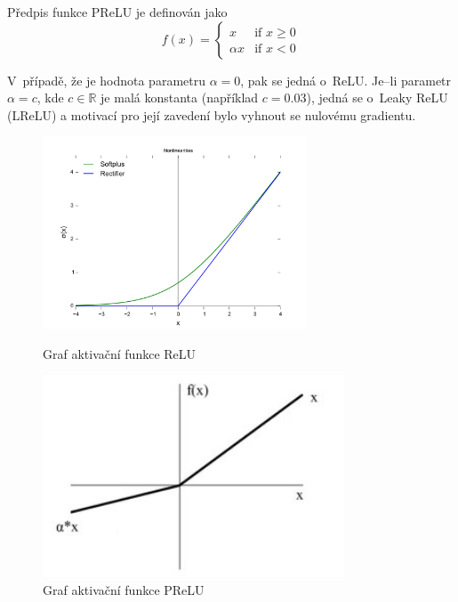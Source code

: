 Předpis funkce PReLU je definován jako
\begin{equation}
  f(x) =
  \begin{cases}
    x & \text{if } x \geq 0 \\
    {\alpha}x & \text{if } x < 0
  \end{cases}
\end{equation}


V~případě, že je hodnota parametru $\alpha=0$, pak se jedná o~ReLU. Je--li parametr $\alpha = c$, kde $c\in\mathbb{R}$ je malá konstanta (například $c = 0.03$), jedná se o~Leaky ReLU (LReLU) a motivací pro její zavedení bylo vyhnout se nulovému gradientu.


\begin{figure}[H]
    \centering
    \begin{minipage}{0.45\textwidth}
        \centering
        \includegraphics[width=0.7\textwidth]{obrazky-figures/ReLU.png}
        \caption{\label{fig:relu}Graf aktivační funkce ReLU}
    \end{minipage}\hfill
    \begin{minipage}{0.45\textwidth}
        \centering
        \includegraphics[width=0.8\textwidth]{obrazky-figures/prelu.jpg}
        \caption{\label{fig:prelu}Graf aktivační funkce PReLU}
    \end{minipage}
\end{figure}



